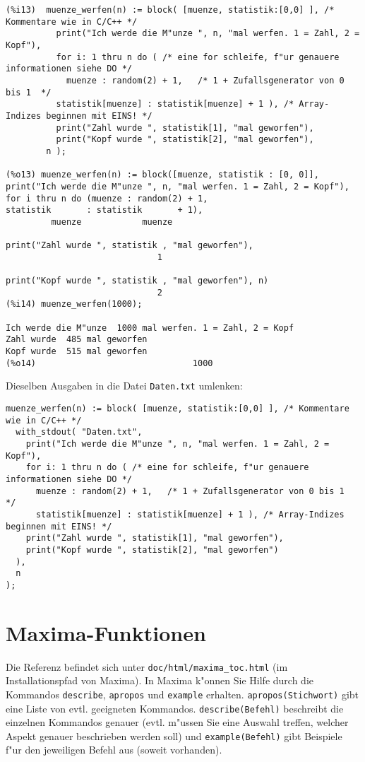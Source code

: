 \documentclass[spanish,12pt,a4paper]{article}
\begin{document}
\scriptsize
\begin{verbatim}
(%i13)  muenze_werfen(n) := block( [muenze, statistik:[0,0] ], /* Kommentare wie in C/C++ */
          print("Ich werde die M"unze ", n, "mal werfen. 1 = Zahl, 2 = Kopf"),
          for i: 1 thru n do ( /* eine for schleife, f"ur genauere informationen siehe DO */
            muenze : random(2) + 1,   /* 1 + Zufallsgenerator von 0 bis 1  */
          statistik[muenze] : statistik[muenze] + 1 ), /* Array-Indizes beginnen mit EINS! */
          print("Zahl wurde ", statistik[1], "mal geworfen"),
          print("Kopf wurde ", statistik[2], "mal geworfen"),
        n );

(%o13) muenze_werfen(n) := block([muenze, statistik : [0, 0]], 
print("Ich werde die M"unze ", n, "mal werfen. 1 = Zahl, 2 = Kopf"), 
for i thru n do (muenze : random(2) + 1, 
statistik       : statistik       + 1), 
         muenze            muenze

print("Zahl wurde ", statistik , "mal geworfen"), 
                              1

print("Kopf wurde ", statistik , "mal geworfen"), n)
                              2
(%i14) muenze_werfen(1000);

Ich werde die M"unze  1000 mal werfen. 1 = Zahl, 2 = Kopf 
Zahl wurde  485 mal geworfen 
Kopf wurde  515 mal geworfen 
(%o14)                               1000
\end{verbatim}
\normalsize

Dieselben Ausgaben in die Datei \verb|Daten.txt| umlenken:

\scriptsize
\begin{verbatim}
muenze_werfen(n) := block( [muenze, statistik:[0,0] ], /* Kommentare wie in C/C++ */
  with_stdout( "Daten.txt", 
    print("Ich werde die M"unze ", n, "mal werfen. 1 = Zahl, 2 = Kopf"),
    for i: 1 thru n do ( /* eine for schleife, f"ur genauere informationen siehe DO */
      muenze : random(2) + 1,   /* 1 + Zufallsgenerator von 0 bis 1  */
      statistik[muenze] : statistik[muenze] + 1 ), /* Array-Indizes beginnen mit EINS! */
    print("Zahl wurde ", statistik[1], "mal geworfen"),
    print("Kopf wurde ", statistik[2], "mal geworfen")
  ),
  n 
);
\end{verbatim}
\normalsize


\section{Maxima-Funktionen}

Die Referenz befindet sich unter \verb|doc/html/maxima_toc.html| (im Installationspfad von Maxima). In Maxima k"onnen Sie Hilfe durch die Kommandos \verb|describe|, \verb|apropos| und \verb|example| erhalten. \verb|apropos(Stichwort)| gibt eine Liste von evtl. geeigneten Kommandos. \verb|describe(Befehl)| beschreibt die einzelnen Kommandos genauer (evtl. m"ussen Sie eine Auswahl treffen, welcher Aspekt genauer beschrieben werden soll) und \verb|example(Befehl)| gibt Beispiele f"ur den jeweiligen Befehl aus (soweit vorhanden).
\end{document}
